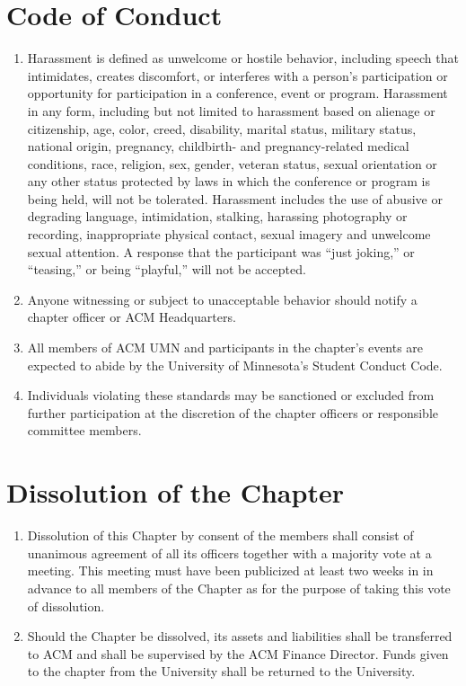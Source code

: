 \section{Code of Conduct}
\begin{enumerate}
	\item Harassment is defined as unwelcome or hostile behavior, including speech that intimidates, creates discomfort, or interferes with a person's participation or opportunity for participation in a conference, event or program. Harassment in any form, including but not limited to harassment based on alienage or citizenship, age, color, creed, disability, marital status, military status, national origin, pregnancy, childbirth- and pregnancy-related medical conditions, race, religion, sex, gender, veteran status, sexual orientation or any other status protected by laws in which the conference or program is being held, will not be tolerated. Harassment includes the use of abusive or degrading language, intimidation, stalking, harassing photography or recording, inappropriate physical contact, sexual imagery and unwelcome sexual attention. A response that the participant was ``just joking,'' or ``teasing,'' or being ``playful,'' will not be accepted.
	\item Anyone witnessing or subject to unacceptable behavior should notify a chapter officer or ACM Headquarters.
	\item All members of ACM UMN and participants in the chapter’s events are expected to abide by the University of Minnesota’s Student Conduct Code.
	\item Individuals violating these standards may be sanctioned or excluded from further participation at the discretion of the chapter officers or responsible committee members.
\end{enumerate}

\section{Dissolution of the Chapter}
\begin{enumerate}
	\item Dissolution of this Chapter by consent of the members shall consist of unanimous agreement of all its officers together with a majority vote at a meeting. This meeting must have been publicized at least two weeks in in advance to all members of the Chapter as for the purpose of taking this vote of dissolution.
	\item Should the Chapter be dissolved, its assets and liabilities shall be transferred to ACM and shall be supervised by the ACM Finance Director.  Funds given to the chapter from the University shall be returned to the University.
\end{enumerate}




